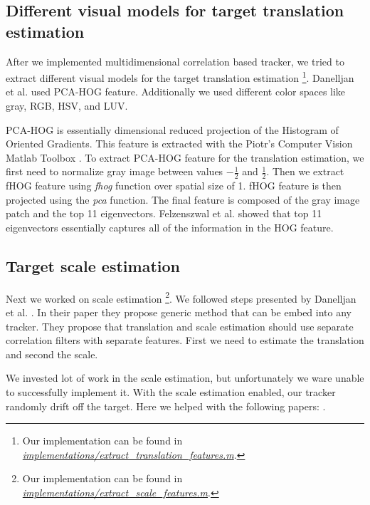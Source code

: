 \documentclass[runningheads]{llncs}
\begin{document}
\subsection{Different visual models for target translation estimation}
After we implemented multidimensional correlation based tracker, we tried to extract different visual models for the target translation estimation \footnote{Our implementation can be found in \href{https://github.com/matjazmav/fri-1819-nmrv-seminar/blob/master/implementations/extract_translation_features.m}{\textit{implementations/\-extract\_translation\_features.m}}.}. Danelljan et al. \cite{danelljan2014accurate} used PCA-HOG feature. Additionally we used different color spaces like gray, RGB, HSV, and LUV.

PCA-HOG is essentially dimensional reduced projection of the Histogram of Oriented Gradients. This feature is extracted with the Piotr's Computer Vision Matlab Toolbox \cite{PMT}. To extract PCA-HOG feature for the translation estimation, we first need to normalize gray image between values $-\frac{1}{2}$ and $\frac{1}{2}$. Then we extract fHOG feature using \textit{fhog} function over spatial size of 1. fHOG feature is then projected using the \textit{pca} function. The final feature is composed of the gray image patch and the top 11 eigenvectors. Felzenszwal et al. \cite{felzenszwalb2009object} showed that top 11 eigenvectors essentially captures all of the information in the HOG feature. 

\subsection{Target scale estimation}

Next we worked on scale estimation \footnote{Our implementation can be found in \href{https://github.com/matjazmav/fri-1819-nmrv-seminar/blob/master/implementations/\-extract_scale_features.m}{\textit{implementations/extract\_scale\_features.m}}.}. We followed steps presented by Danelljan et al. \cite{danelljan2014accurate}. In their paper they propose generic method that can be embed into any tracker. They propose that translation and scale estimation should use separate correlation filters with separate features. First we need to estimate the translation and second the scale. 

We invested lot of work in the scale estimation, but unfortunately we ware unable to successfully implement it. With the scale estimation enabled, our tracker randomly drift off the target. Here we helped with the following papers: \cite{danelljan2014accurate,chen2015experimental,zhang2018visual}.
\end{document}
